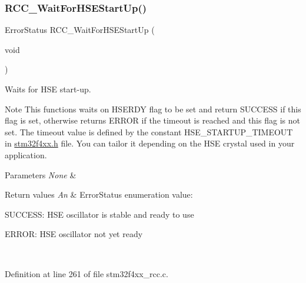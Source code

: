 \subsubsection{\texorpdfstring{R\+C\+C\+\_\+\+Wait\+For\+H\+S\+E\+Start\+Up()}{RCC\_WaitForHSEStartUp()}}
{\footnotesize\ttfamily Error\+Status R\+C\+C\+\_\+\+Wait\+For\+H\+S\+E\+Start\+Up (\begin{DoxyParamCaption}\item[{void}]{ }\end{DoxyParamCaption})}



Waits for H\+SE start-\/up. 

\begin{DoxyNote}{Note}
This functions waits on H\+S\+E\+R\+DY flag to be set and return S\+U\+C\+C\+E\+SS if this flag is set, otherwise returns E\+R\+R\+OR if the timeout is reached and this flag is not set. The timeout value is defined by the constant H\+S\+E\+\_\+\+S\+T\+A\+R\+T\+U\+P\+\_\+\+T\+I\+M\+E\+O\+UT in \hyperlink{stm32f4xx_8h}{stm32f4xx.\+h} file. You can tailor it depending on the H\+SE crystal used in your application. 
\end{DoxyNote}

\begin{DoxyParams}{Parameters}
{\em None} & \\
\hline
\end{DoxyParams}

\begin{DoxyRetVals}{Return values}
{\em An} & Error\+Status enumeration value\+:
\begin{DoxyItemize}
\item S\+U\+C\+C\+E\+SS\+: H\+SE oscillator is stable and ready to use
\item E\+R\+R\+OR\+: H\+SE oscillator not yet ready 
\end{DoxyItemize}\\
\hline
\end{DoxyRetVals}


Definition at line 261 of file stm32f4xx\+\_\+rcc.\+c.

